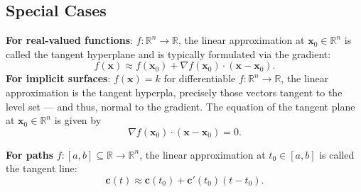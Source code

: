 \documentclass[11pt]{article}
\renewcommand{\vec}[1]{\mathbf{#1}}
\renewcommand{\grad}{\nabla}
\begin{document}
\subsection{Special Cases}

\textbf{For real-valued functions}: $f: \mathbb{R}^{n} \to \mathbb{R}$, the linear approximation at $\vec{x}_{0} \in \mathbb{R}^{n}$ is called the tangent hyperplane and is typically formulated via the gradient:
\[
	f(\vec{x}) \approx f(\vec{x}_{0}) + \grad f (\vec{x}_{0}) \cdot (\vec{x} - \vec{x}_{0}).
\]
\textbf{For implicit surfaces}: $f(\vec{x}) = k$ for differentiable $f: \mathbb{R}^{n} \to \mathbb{R}$, the linear approximation is the tangent hyperpla, precisely those vectors tangent to the level set --- and thus, normal to the gradient. The equation of the tangent plane at $\vec{x}_{0} \in \mathbb{R}^{n}$ is given by
\[
	\grad f (\vec{x}_{0}) \cdot (\vec{x} - \vec{x}_{0}) = 0.
\]


\textbf{For paths} $f: [a, b] \subseteq \mathbb{R} \to \mathbb{R}^{n}$, the linear approximation at $t_{0} \in [a, b]$ is called the tangent line:
\[
	\vec{c}(t) \approx \vec{c}(t_{0}) + \vec{c}'(t_{0}) (t - t_{0}).
\]


\end{document}
